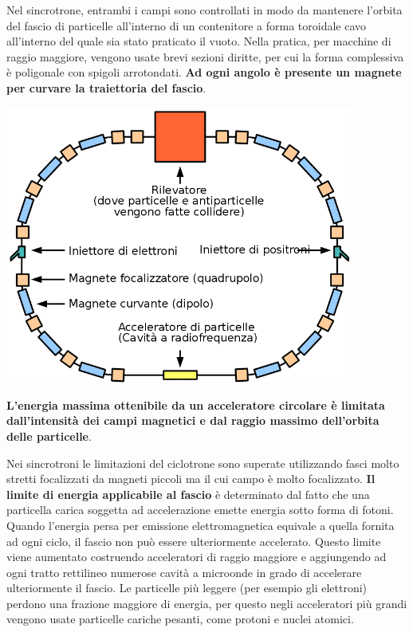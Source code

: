 \documentclass[a4paper,11pt,twoside,openany]{book}
\theoremstyle{definition}
\theoremstyle{plain}
\theoremstyle{plain}
\theoremstyle{definition}
\begin{document}
Nel sincrotrone, entrambi i campi sono controllati in modo da mantenere l'orbita del fascio di particelle all'interno di un contenitore a forma toroidale cavo all'interno del quale sia stato praticato il vuoto. Nella pratica, per macchine di raggio maggiore, vengono usate brevi sezioni diritte, per cui la forma complessiva è poligonale con spigoli arrotondati. \textbf{Ad ogni angolo è presente un magnete per curvare la traiettoria del fascio}.

\begin{center}
\includegraphics[width=4.5in]{immagini/sincrotron.jpg} %
\end{center}

\textbf{L'energia massima ottenibile da un acceleratore circolare è limitata dall'intensità dei campi magnetici e dal raggio massimo dell'orbita delle particelle}.

Nei sincrotroni le limitazioni del ciclotrone sono superate utilizzando fasci molto stretti focalizzati da magneti piccoli ma il cui campo è molto focalizzato. \textbf{Il limite di energia applicabile al fascio} è determinato dal fatto che una particella carica soggetta ad accelerazione emette energia sotto forma di fotoni. Quando l'energia persa per emissione elettromagnetica equivale a quella fornita ad ogni ciclo, il fascio non può essere ulteriormente accelerato. Questo limite viene aumentato costruendo acceleratori di raggio maggiore e aggiungendo ad ogni tratto rettilineo numerose cavità a microonde in grado di accelerare ulteriormente il fascio. Le particelle più leggere (per esempio gli elettroni) perdono una frazione maggiore di energia, per questo negli acceleratori più grandi vengono usate particelle cariche pesanti, come protoni e nuclei atomici.
\end{document}
